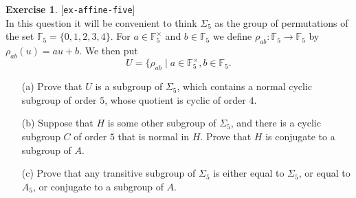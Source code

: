 \documentclass{amsart}
\newcommand{\F}         {{\mathbb{F}}}
\newcommand{\Sg}        {\Sigma}
\newcommand{\st}        {\;|\;}
\newcommand{\tm}        {\times}
\renewcommand{\:}{\colon}
\newcommand{\lastexlabel}{}
\newcommand{\exlabel}[1]{
 \global\def\lastexlabel{#1}\label{#1}[\texttt{#1}]\ \\
}
\newcommand{\exlabel}[1]{
 \global\def\lastexlabel{#1}\label{#1}
}
\theoremstyle{definition}
\newtheorem{exercise}{Exercise}[section]
\begin{document}
\begin{exercise}\exlabel{ex-affine-five}
 In this question it will be convenient to think $\Sg_5$ as the group
 of permutations of the set $\F_5=\{0,1,2,3,4\}$.  For $a\in\F_5^\tm$
 and $b\in\F_5$ we define $\rho_{ab}\:\F_5\to\F_5$ by
 $\rho_{ab}(u)=au+b$.  We then put 
 \[ U = \{\rho_{ab}\st a\in\F_5^\tm,b\in\F_5.  \]
 \begin{itemize}
  \item[(a)] Prove that $U$ is a subgroup of $\Sg_5$, which contains a
   normal cyclic subgroup of order $5$, whose quotient is cyclic of
   order $4$.
  \item[(b)] Suppose that $H$ is some other subgroup of $\Sg_5$, and
   there is a cyclic subgroup $C$ of order $5$ that is normal in $H$.
   Prove that $H$ is conjugate to a subgroup of $A$.
  \item[(c)] Prove that any transitive subgroup of $\Sg_5$ is either
   equal to $\Sg_5$, or equal to $A_5$, or conjugate to a subgroup of
   $A$. 
 \end{itemize}
\end{exercise}
\end{document}
